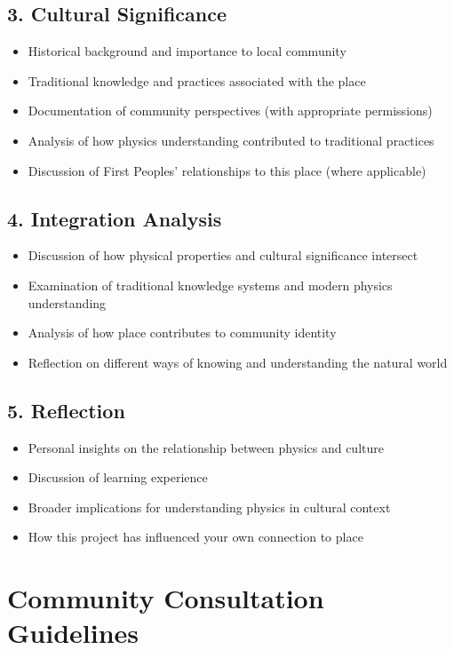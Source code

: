 \documentclass[12pt]{article}
\begin{document}
\subsection*{3. Cultural Significance }
\begin{itemize}
    \item Historical background and importance to local community
    \item Traditional knowledge and practices associated with the place
    \item Documentation of community perspectives (with appropriate permissions)
    \item Analysis of how physics understanding contributed to traditional practices
    \item Discussion of First Peoples' relationships to this place (where applicable)
\end{itemize}

\subsection*{4. Integration Analysis }
\begin{itemize}
    \item Discussion of how physical properties and cultural significance intersect
    \item Examination of traditional knowledge systems and modern physics understanding
    \item Analysis of how place contributes to community identity
    \item Reflection on different ways of knowing and understanding the natural world
\end{itemize}

\subsection*{5. Reflection }
\begin{itemize}
    \item Personal insights on the relationship between physics and culture
    \item Discussion of learning experience
    \item Broader implications for understanding physics in cultural context
    \item How this project has influenced your own connection to place
\end{itemize}


\newpage

\section*{Community Consultation Guidelines}
\end{document}
